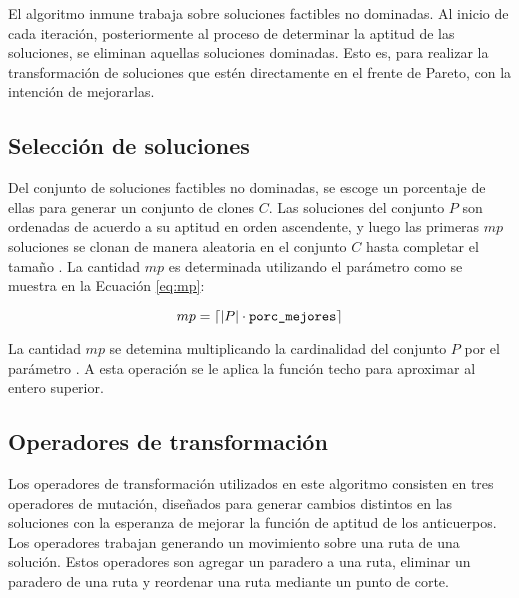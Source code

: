 El algoritmo inmune trabaja sobre soluciones factibles no dominadas. Al inicio de cada iteración, posteriormente al proceso de determinar la aptitud de las soluciones, se eliminan aquellas soluciones dominadas. Esto es, para realizar la transformación de soluciones que estén directamente en el frente de Pareto, con la intención de mejorarlas.

\subsection{Selección de soluciones}

Del conjunto de soluciones factibles no dominadas, se escoge un porcentaje de ellas para generar un conjunto de clones $C$. Las soluciones del conjunto $P$ son ordenadas de acuerdo a su aptitud en orden ascendente, y luego las primeras $mp$ soluciones se clonan de manera aleatoria en el conjunto $C$ hasta completar el tamaño \clonsize. La cantidad $mp$ es determinada utilizando el parámetro \pmejores{} como se muestra en la Ecuación \eqref{eq:mp}:

\begin{equation}
\label{eq:mp}
mp = \ceil*{|P| \cdot \pmejores}
\end{equation}

La cantidad $mp$ se detemina multiplicando la cardinalidad del conjunto $P$ por el parámetro \pmejores. A esta operación se le aplica la función techo para aproximar al entero superior.

\subsection{Operadores de transformación}

Los operadores de transformación utilizados en este algoritmo consisten en tres operadores de mutación, diseñados para generar cambios distintos en las soluciones con la esperanza de mejorar la función de aptitud de los anticuerpos. Los operadores trabajan generando un movimiento sobre una ruta de una solución. Estos operadores son agregar un paradero a una ruta, eliminar un paradero de una ruta y reordenar una ruta mediante un punto de corte.

